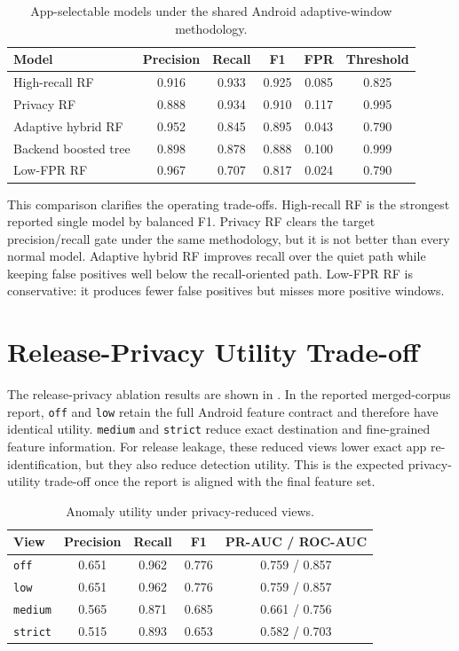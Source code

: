 \begin{table}[htbp]
  \centering
  \caption{App-selectable models under the shared Android adaptive-window methodology.}
  \label{tab:current-app-comparison}
  \small
  \begin{tabular}{lccccc}
    \toprule
    Model & Precision & Recall & F1 & FPR & Threshold \\
    \midrule
    High-recall RF & 0.916 & 0.933 & 0.925 & 0.085 & 0.825 \\
    Privacy RF & 0.888 & 0.934 & 0.910 & 0.117 & 0.995 \\
    Adaptive hybrid RF & 0.952 & 0.845 & 0.895 & 0.043 & 0.790 \\
    Backend boosted tree & 0.898 & 0.878 & 0.888 & 0.100 & 0.999 \\
    Low-FPR RF & 0.967 & 0.707 & 0.817 & 0.024 & 0.790 \\
    \bottomrule
  \end{tabular}
\end{table}

This comparison clarifies the operating trade-offs. High-recall RF is the strongest reported single
model by balanced F1. Privacy RF clears the target precision/recall gate under the same methodology,
but it is not better than every normal model. Adaptive hybrid RF improves recall over the quiet path
while keeping false positives well below the recall-oriented path. Low-FPR RF is conservative: it
produces fewer false positives but misses more positive windows.

\section{Release-Privacy Utility Trade-off}
The release-privacy ablation results are shown in . In the reported merged-corpus
report, \texttt{off} and \texttt{low} retain the full Android feature contract and therefore have
identical utility. \texttt{medium} and \texttt{strict} reduce exact destination and fine-grained
feature information. For release leakage, these reduced views lower exact app re-identification,
but they also reduce detection utility. This is the expected privacy-utility trade-off once the
report is aligned with the final feature set.

\begin{table}[htbp]
  \centering
  \caption{Anomaly utility under privacy-reduced views.}
  \label{tab:ablation}
  \begin{tabular}{lcccc}
    \toprule
    View & Precision & Recall & F1 & PR-AUC / ROC-AUC \\
    \midrule
    \texttt{off} & 0.651 & 0.962 & 0.776 & 0.759 / 0.857 \\
    \texttt{low} & 0.651 & 0.962 & 0.776 & 0.759 / 0.857 \\
    \texttt{medium} & 0.565 & 0.871 & 0.685 & 0.661 / 0.756 \\
    \texttt{strict} & 0.515 & 0.893 & 0.653 & 0.582 / 0.703 \\
    \bottomrule
  \end{tabular}
\end{table}


